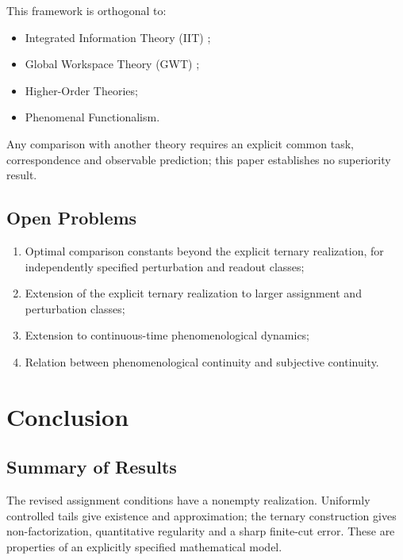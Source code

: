 \documentclass[11pt,a4paper]{article}
\theoremstyle{plain}
\theoremstyle{definition}
\theoremstyle{remark}
\begin{document}
This framework is orthogonal to:
\begin{itemize}[leftmargin=*]
    \item Integrated Information Theory (IIT) \cite{tononi2004};
    \item Global Workspace Theory (GWT) \cite{baars1988};
    \item Higher-Order Theories;
    \item Phenomenal Functionalism.
\end{itemize}

Any comparison with another theory requires an explicit common task, correspondence and observable prediction; this paper establishes no superiority result.

\subsection{Open Problems}

\begin{enumerate}[leftmargin=*]
    \item Optimal comparison constants beyond the explicit ternary realization, for independently specified perturbation and readout classes;
    \item Extension of the explicit ternary realization to larger assignment and perturbation classes;
    \item Extension to continuous-time phenomenological dynamics;
    \item Relation between phenomenological continuity and subjective continuity.
\end{enumerate}

\section{Conclusion}

\subsection{Summary of Results}
The revised assignment conditions have a nonempty realization. Uniformly controlled tails give existence and approximation; the ternary construction gives non-factorization, quantitative regularity and a sharp finite-cut error. These are properties of an explicitly specified mathematical model.
\end{document}
